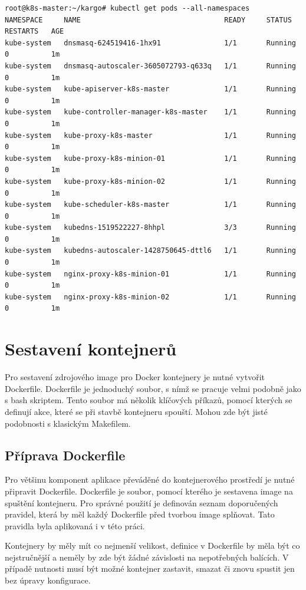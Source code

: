 \begin{lstlisting}[caption={Seznam podů po nainstalovaní Kuberentes},label= {lst:pods}]
root@k8s-master:~/kargo# kubectl get pods --all-namespaces
NAMESPACE     NAME                                  READY     STATUS    RESTARTS   AGE
kube-system   dnsmasq-624519416-1hx91               1/1       Running   0          1m
kube-system   dnsmasq-autoscaler-3605072793-q633q   1/1       Running   0          1m
kube-system   kube-apiserver-k8s-master             1/1       Running   0          1m
kube-system   kube-controller-manager-k8s-master    1/1       Running   0          1m
kube-system   kube-proxy-k8s-master                 1/1       Running   0          1m
kube-system   kube-proxy-k8s-minion-01              1/1       Running   0          1m
kube-system   kube-proxy-k8s-minion-02              1/1       Running   0          1m
kube-system   kube-scheduler-k8s-master             1/1       Running   0          1m
kube-system   kubedns-1519522227-8hhpl              3/3       Running   0          1m
kube-system   kubedns-autoscaler-1428750645-dttl6   1/1       Running   0          1m
kube-system   nginx-proxy-k8s-minion-01             1/1       Running   0          1m
kube-system   nginx-proxy-k8s-minion-02             1/1       Running   0          1m
\end{lstlisting}


\section{Sestavení kontejnerů}
Pro sestavení zdrojového image pro Docker kontejnery je nutné vytvořit Dockerfile. Dockerfile je jednoduchý soubor, s nímž se pracuje velmi podobně jako s bash skriptem. Tento soubor má několik klíčových příkazů, pomocí kterých se definují akce, které se při stavbě kontejneru spouští. Mohou zde být jisté podobnosti s klasickým Makefilem. 


\subsection{Příprava Dockerfile}
\label{sec:priprava}
Pro většinu komponent aplikace převáděné do kontejnerového prostředí je nutné připravit Dockerfile. Dockerfile je soubor, pomocí kterého je sestavena image na spuštění kontejneru. Pro správné použití je definován seznam doporučených pravidel, která by měl každý Dockerfile před tvorbou image splňovat. Tato pravidla byla aplikovaná i v této práci.

Kontejnery by měly mít co nejmenší velikost, definice v Dockerfile by měla být co nejstručnější a neměly by zde být žádné závislosti na nepotřebných balících. V případě nutnosti musí být možné kontejner zastavit, smazat či znovu spustit jen bez úpravy konfigurace.

